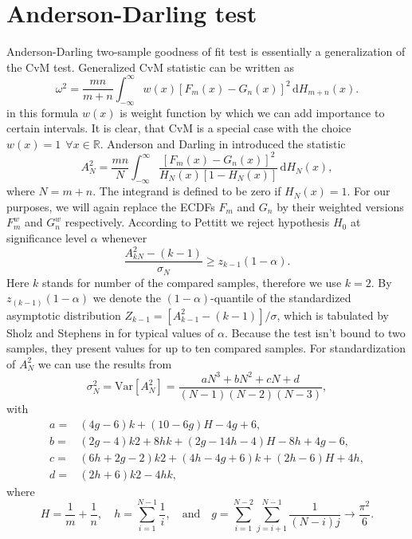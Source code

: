 \section{Anderson-Darling test}
Anderson-Darling two-sample goodness of fit test is essentially a generalization of the CvM test. Generalized CvM statistic can be written as 
\begin{equation}
\omega^2 = \frac{mn}{m+n} \int_{-\infty}^\infty w(x) \left[F_m(x) - G_n(x) \right]^2 \,\mathrm{d} H_{m+n}(x).
\end{equation}
in this formula $w(x)$ is weight function by which we can add importance to certain intervals. It is clear, that CvM is a special case with the choice $w(x) = 1 \:\: \forall x \in \mathbb{R}.$ Anderson and Darling   in \cite{AndersonDarling1954} introduced the statistic 
\begin{equation}
A^2_{N} = \frac{mn}{N} \int_{-\infty}^\infty \frac{\left[F_m(x) - G_n(x) \right]^2}{H_{N}(x)\left[ 1 - H_{N}(x)\right]} \,\mathrm{d} H_{N}(x),
\end{equation}
where $N = m+n$. The integrand is defined to be zero if $H_{N}(x) = 1$. For our purposes, we will again replace the ECDFs $F_m$ and $G_n$ by their weighted versions $F_m^w$ and $G_n^w$ respectively.
According to Pettitt \cite{Pettitt1976} we reject hypothesis $H_0$ at significance level $\alpha$ whenever
\begin{equation}
\frac{A^2_{kN} - (k-1)}{\sigma_{N}} \geq z_{k-1}(1-\alpha).
\end{equation}
Here $k$ stands for number of the compared samples, therefore we use $k=2$. By $z_{(k-1)}(1-\alpha)$ we denote the $(1-\alpha)$-quantile of the standardized asymptotic distribution $Z_{k-1} = [A^2_{k-1} - (k-1)]/{\sigma}$, which is tabulated by Sholz and Stephens in \cite{Sholz1986} for typical values of $\alpha$.  Because the test isn't bound to two samples, they present values for up to ten compared samples.
For standardization of $A^2_{N}$ we can use the results from \cite{Sholz1986} 
\begin{equation}
\sigma_{N}^2 = \mathrm{Var}\left[ A^2_{N}\right] = \frac{ aN^3 + bN^2 + cN + d
 }{(N-1)(N-2)(N-3)},
\end{equation}
with 
\begin{align*}
a = & (4g - 6)k + (10 - 6g)H - 4g + 6, \\
b = &(2g - 4)k 2 + 8hk + (2g - 14h - 4)H - 8h + 4g - 6, \\
c = &(6h + 2g - 2)k2 + (4h - 4g + 6)k + (2h - 6)H + 4h,  \\
d = &(2h + 6)k 2 - 4hk, 
\end{align*}
where
\begin{equation}
H = \frac{1}{m}+\frac{1}{n},\quad	h = \sum_{i=1}^{N-1}\frac{1}{i},\quad \mathrm{ and } \quad g = \sum_{i=1}^{N-2}\sum_{j=i+1}^{N-1}\frac{1}{(N-i)j}\rightarrow \frac{\pi^2}{6}.
\end{equation}

